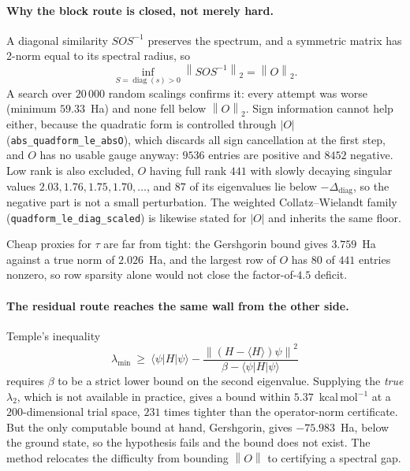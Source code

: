 \documentclass[11pt,a4paper]{article}
\theoremstyle{plain}
\theoremstyle{definition}
\theoremstyle{remark}
\newcommand{\norm}[1]{\left\lVert #1\right\rVert}
\providecommand{\path}[1]{\texttt{#1}}
\begin{document}
\paragraph{Why the block route is closed, not merely hard.}
A diagonal similarity $SOS^{-1}$ preserves the spectrum, and a symmetric matrix has
2-norm equal to its spectral radius, so
\[
  \inf_{S=\operatorname{diag}(s)>0}\norm{SOS^{-1}}_2 = \norm{O}_2 .
\]
A search over $20\,000$ random scalings confirms it: every attempt was worse
(minimum $59.33$~Ha) and none fell below $\norm{O}_2$. Sign information cannot help
either, because the quadratic form is controlled through $|O|$
(\path{abs_quadform_le_absO}), which discards all sign cancellation at the first
step, and $O$ has no usable gauge anyway: $9536$ entries are positive and $8452$
negative. Low rank is also excluded, $O$ having full rank $441$ with slowly decaying
singular values $2.03,1.76,1.75,1.70,\dots$, and $87$ of its eigenvalues lie below
$-\Delta_{\mathrm{diag}}$, so the negative part is not a small perturbation. The
weighted Collatz--Wielandt family (\path{quadform_le_diag_scaled}) is likewise
stated for $|O|$ and inherits the same floor.

Cheap proxies for $\tau$ are far from tight: the Gershgorin bound gives
$3.759$~Ha against a true norm of $2.026$~Ha, and the largest row of $O$ has $80$ of
$441$ entries nonzero, so row sparsity alone would not close the factor-of-$4.5$
deficit.

\paragraph{The residual route reaches the same wall from the other side.}
Temple's inequality
\[
  \lambda_{\min}\ \ge\ \langle\psi|H|\psi\rangle
   - \frac{\norm{(H-\langle H\rangle)\psi}^{2}}{\beta-\langle\psi|H|\psi\rangle}
\]
requires $\beta$ to be a strict lower bound on the second eigenvalue. Supplying the
\emph{true} $\lambda_2$, which is not available in practice, gives a bound within
$5.37$~kcal\,mol$^{-1}$ at a $200$-dimensional trial space, $231$ times tighter than
the operator-norm certificate. But the only computable bound at hand, Gershgorin,
gives $-75.983$~Ha, below the ground state, so the hypothesis fails and the bound
does not exist. The method relocates the difficulty from bounding $\norm{O}$ to
certifying a spectral gap.
\end{document}
